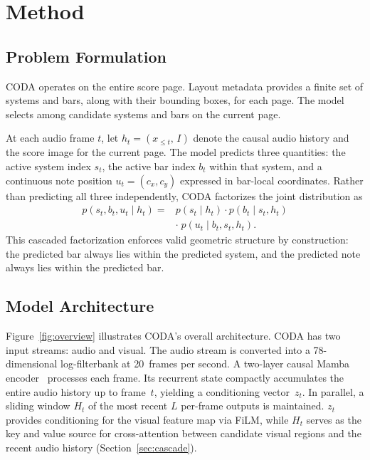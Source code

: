 \documentclass{article}
\begin{document}
\section{Method}\label{sec:method}

\subsection{Problem Formulation}

CODA operates on the entire score page. Layout metadata provides a finite set of systems and bars, along with their bounding boxes, for each page. The model selects among candidate systems and bars on the current page.

At each audio frame $t$, let $h_t = (x_{\le t},\, I)$ denote the causal audio history and the score image for the current page. The model predicts three quantities: the active system index $s_t$, the active bar index $b_t$ within that system, and a continuous note position $u_t = (c_x, c_y)$ expressed in bar-local coordinates. Rather than predicting all three independently, CODA factorizes the joint distribution as
\begin{equation}
\begin{split}
p(s_t, b_t, u_t \mid h_t) = {} & p(s_t \mid h_t) \cdot p(b_t \mid s_t, h_t) \\
& \cdot\; p(u_t \mid b_t, s_t, h_t).
\end{split}
\end{equation}
This cascaded factorization enforces valid geometric structure by construction: the predicted bar always lies within the predicted system, and the predicted note always lies within the predicted bar.

\subsection{Model Architecture}

Figure~\ref{fig:overview} illustrates CODA's overall architecture. CODA has two input streams: audio and visual. The audio stream is converted into a 78-dimensional log-filterbank at 20~frames per second. A two-layer causal Mamba encoder~\cite{gu2024mamba} processes each frame. Its recurrent state compactly accumulates the entire audio history up to frame~$t$, yielding a conditioning vector~$z_t$. In parallel, a sliding window $H_t$ of the most recent $L$ per-frame outputs is maintained. $z_t$ provides conditioning for the visual feature map via FiLM, while $H_t$ serves as the key and value source for cross-attention between candidate visual regions and the recent audio history (Section~\ref{sec:cascade}).
 
\end{document}
